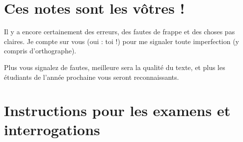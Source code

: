 					\section*{Ces notes sont les vôtres !}


Il y a encore certainement des erreurs, des fautes de frappe et des choses pas claires. Je compte sur vous (oui : toi !) pour me signaler toute imperfection (y compris d'orthographe).

Plus vous signalez de fautes, meilleure sera la qualité du texte, et plus les étudiants de l'année prochaine vous seront reconnaissants.


\section{Instructions pour les examens et interrogations}

